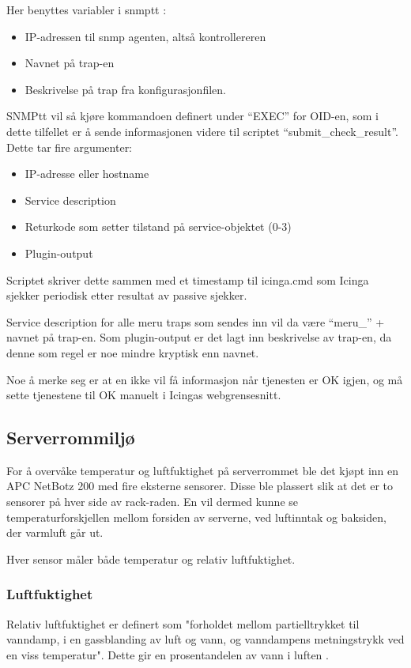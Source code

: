 Her benyttes variabler i snmptt \cite{snmptrans}:
\begin{itemize}
	\item IP-adressen til snmp agenten, altså kontrollereren
	\item Navnet på trap-en
	\item Beskrivelse på trap fra konfigurasjonfilen.
\end{itemize}

SNMPtt vil så kjøre kommandoen definert under ``EXEC'' for OID-en, som i dette tilfellet er å sende informasjonen videre til scriptet ``submit\_check\_result''. Dette tar fire argumenter:

\begin{itemize}
	\item IP-adresse eller hostname 
	\item Service description
	\item Returkode som setter tilstand på service-objektet (0-3)
	\item Plugin-output
\end{itemize}
Scriptet skriver dette sammen med et timestamp til icinga.cmd som Icinga sjekker periodisk etter resultat av passive sjekker.

Service description for alle meru traps som sendes inn vil da være ``meru\_'' + navnet på trap-en. Som plugin-output er det lagt inn beskrivelse av trap-en, da denne som regel er noe mindre kryptisk enn navnet.

Noe å merke seg er at en ikke vil få informasjon når tjenesten er OK igjen, og må sette tjenestene til OK manuelt i Icingas webgrensesnitt.

\subsection{Serverrommiljø}
For å overvåke temperatur og luftfuktighet på serverrommet ble det kjøpt inn en APC NetBotz 200 \cite{netbotz2} med fire eksterne sensorer. Disse ble plassert slik at det er to sensorer på hver side av rack-raden. En vil dermed kunne se temperaturforskjellen mellom forsiden av serverne, ved luftinntak og baksiden, der varmluft går ut.

Hver sensor måler både temperatur og relativ luftfuktighet.

\subsubsection{Luftfuktighet}
Relativ luftfuktighet er definert som "forholdet mellom partielltrykket til vanndamp, i en gassblanding av luft og vann, og vanndampens metningstrykk ved en viss temperatur". Dette gir en prosentandelen av vann i luften \cite{wiki:luftfuktighet}. 

